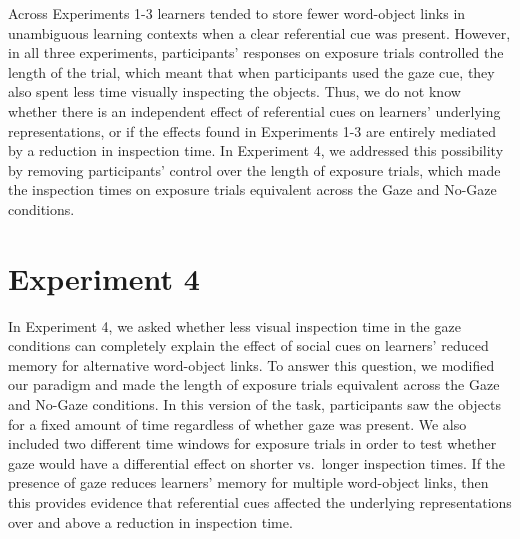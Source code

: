 \documentclass[authoryear, review]{elsarticle}
\begin{document}
Across Experiments 1-3 learners tended to store fewer word-object links
in unambiguous learning contexts when a clear referential cue was
present. However, in all three experiments, participants' responses on
exposure trials controlled the length of the trial, which meant that
when participants used the gaze cue, they also spent less time visually
inspecting the objects. Thus, we do not know whether there is an
independent effect of referential cues on learners' underlying
representations, or if the effects found in Experiments 1-3 are entirely
mediated by a reduction in inspection time. In Experiment 4, we
addressed this possibility by removing participants' control over the
length of exposure trials, which made the inspection times on exposure
trials equivalent across the Gaze and No-Gaze conditions.

\section{Experiment 4}\label{experiment-4}

In Experiment 4, we asked whether less visual inspection time in the
gaze conditions can completely explain the effect of social cues on
learners' reduced memory for alternative word-object links. To answer
this question, we modified our paradigm and made the length of exposure
trials equivalent across the Gaze and No-Gaze conditions. In this
version of the task, participants saw the objects for a fixed amount of
time regardless of whether gaze was present. We also included two
different time windows for exposure trials in order to test whether gaze
would have a differential effect on shorter vs.~longer inspection times.
If the presence of gaze reduces learners' memory for multiple
word-object links, then this provides evidence that referential cues
affected the underlying representations over and above a reduction in
inspection time.
\end{document}
